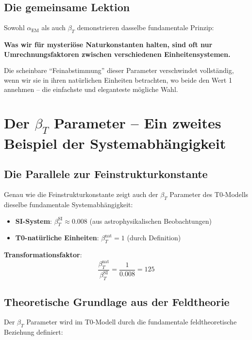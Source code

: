 \subsection{Die gemeinsame Lektion}
\label{subsec:common_lesson}

Sowohl $\alpha_{\text{EM}}$ als auch $\beta_T$ demonstrieren dasselbe fundamentale Prinzip:

\textbf{Was wir für mysteriöse Naturkonstanten halten, sind oft nur Umrechnungsfaktoren zwischen verschiedenen Einheitensystemen.}

Die scheinbare ``Feinabstimmung'' dieser Parameter verschwindet vollständig, wenn wir sie in ihren natürlichen Einheiten betrachten, wo beide den Wert 1 annehmen -- die einfachste und eleganteste mögliche Wahl.
\section{Der $\beta_T$ Parameter -- Ein zweites Beispiel der Systemabhängigkeit}
\label{sec:beta_t}

\subsection{Die Parallele zur Feinstrukturkonstante}
\label{subsec:beta_parallel}

Genau wie die Feinstrukturkonstante zeigt auch der $\beta_T$ Parameter des T0-Modells dieselbe fundamentale Systemabhängigkeit:

\begin{itemize}
	\item \textbf{SI-System}: $\beta_T^{\text{SI}} \approx 0.008$ (aus astrophysikalischen Beobachtungen)
	\item \textbf{T0-natürliche Einheiten}: $\beta_T^{\text{nat}} = 1$ (durch Definition)
\end{itemize}

\textbf{Transformationsfaktor}: 
\begin{equation}
	\frac{\beta_T^{\text{nat}}}{\beta_T^{\text{SI}}} = \frac{1}{0.008} = 125
\end{equation}

\subsection{Theoretische Grundlage aus der Feldtheorie}
\label{subsec:beta_field_theory}

Der $\beta_T$ Parameter wird im T0-Modell durch die fundamentale feldtheoretische Beziehung definiert:

